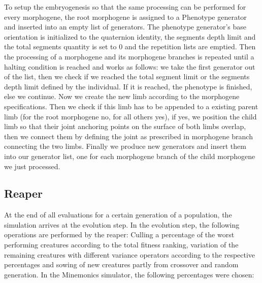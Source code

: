\documentclass[main]{subfiles}
\begin{document}
To setup the embryogenesis so that the same processing can be performed for every morphogene, the root morphogene is assigned to a Phenotype generator and inserted into an empty list of generators. %
%
The phenotype generator's base orientation is initialized to the quaternion identity, the segments depth limit and the total segments quantity is set to 0 and the repetition lists are emptied. %
%
Then the processing of a morphogene and its morphogene branches is repeated until a halting condition is reached and works as follows: we take the first generator out of the list, then we check if we reached the total segment limit or the segments depth limit defined by the individual. %
%
If it is reached, the phenotype is finished, else we continue. %
%
Now we create the new limb according to the morphogene specifications. %
%
Then we check if this limb has to be appended to a existing parent limb (for the root morphogene no, for all others yes), if yes, we position the child limb so that their joint anchoring points on the surface of both limbs overlap, then we connect them by defining the joint as prescribed in morphogene branch connecting the two limbs. %
%
Finally we produce new generators and insert them into our generator list, one for each morphogene branch of the child morphogene we just processed. 

\subsection{Reaper}
\label{subsection:Reaper}

At the end of all evaluations for a certain generation of a population, the simulation arrives at the evolution step. %
%
In the evolution step, the following operations are performed by the reaper: Culling a percentage of the worst performing creatures according to the total fitness ranking, variation of the remaining creatures with different variance operators according to the respective percentages and sowing of new creatures partly from crossover and random generation. %
%
In the Minemonics simulator, the following percentages were chosen:
\end{document}
